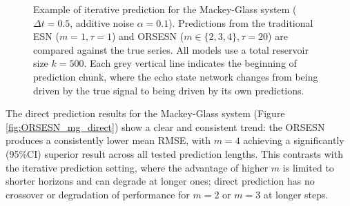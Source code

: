 \begin{figure}
    \centering
    \caption{Example of iterative prediction for the Mackey-Glass system ($\Delta t=0.5$, additive noise $\alpha=0.1$). Predictions from the traditional ESN ($m=1, \tau=1$) and ORSESN ($m \in \{2,3,4\}, \tau=20$) are compared against the true series. All models use a total reservoir size $k=500$. Each grey vertical line indicates the beginning of prediction chunk, where the echo state network changes from being driven by the true signal to being driven by its own predictions.}
    \label{fig:ORSESN_mg_freerun}
\end{figure}

The direct prediction results for the Mackey-Glass system (Figure \ref{fig:ORSESN_mg_direct}) show a clear and consistent trend: the ORSESN produces a consistently lower mean RMSE, with $m=4$ achieving a significantly (95\%CI) superior result across all tested prediction lengths. This contrasts with the iterative prediction setting, where the advantage of higher $m$ is limited to shorter horizons and can degrade at longer ones; direct prediction has no crossover or degradation of performance for $m=2$ or $m=3$ at longer steps.

